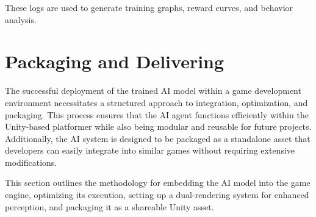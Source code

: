 \documentclass[12pt,oneside,openright,a4paper]{cpe-english-project}
\begin{document}
These logs are used to generate training graphs, reward curves, and behavior analysis.









\section {Packaging and Delivering}
The successful deployment of the trained AI model within a game development environment necessitates a structured approach to integration, optimization, and packaging. This process ensures that the AI agent functions efficiently within the Unity-based platformer while also being modular and reusable for future projects. Additionally, the AI system is designed to be packaged as a standalone asset that developers can easily integrate into similar games without requiring extensive modifications.\par
This section outlines the methodology for embedding the AI model into the game engine, optimizing its execution, setting up a dual-rendering system for enhanced perception, and packaging it as a shareable Unity asset.\par
\end{document}

